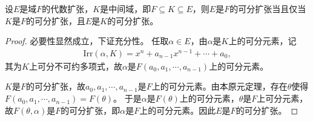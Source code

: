 \documentclass[../../main.tex]{subfiles}%
\begin{document}
\begin{theorem}
设$E$是域$F$的代数扩张，$K$是中间域，即$F\subseteq K\subseteq E$，则$E$是$F$的可分扩张当且仅当$K$是$F$的可分扩张，且$E$是$K$的可分扩张。
\end{theorem}
\begin{proof}

必要性显然成立，下证充分性。
任取$\alpha\in E$，由$\alpha$是$K$上的可分元素，记
\begin{align*}
\mathrm{Irr}(\alpha,K)=x^n+a_{n-1}x^{n-1}+\cdots+a_0,
\end{align*}
其为$K$上可分不可约多项式，故$\alpha$是$F(a_0,a_1,\cdots,a_{n-1})$上的可分元素。

$K$是$F$的可分扩张，故$a_0,a_1,\cdots,a_{n-1}$是$F$上的可分元素。由本原元定理，存在$\theta$使得$F(a_0,a_1,\cdots,a_{n-1})=F(\theta)$。
于是$\alpha$是$F(\theta)$上的可分元素，$\theta$是$F$上可分元素，故$F(\theta,\alpha)$是$F$的可分扩张，即$\alpha$是$F$上的可分元素。因此$E$是$F$的可分扩张。

\end{proof}
\end{document}
